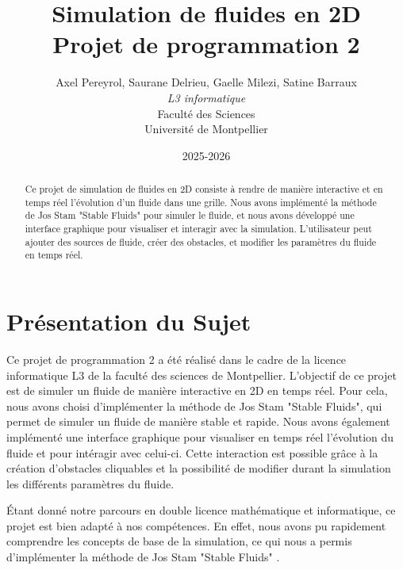 \documentclass[a4paper]{article}
\title{Simulation de fluides en 2D \\ %
Projet de programmation 2}
\author{Axel Pereyrol, Saurane Delrieu, Gaelle Milezi, Satine Barraux \\
    \emph{L3 informatique} \\
    Faculté des Sciences \\
    Université de Montpellier
}
\date{2025-2026}
\begin{document}
\maketitle     %
\begin{abstract}     %
Ce projet de simulation de fluides en 2D consiste à rendre de manière interactive et 
en temps réel l'évolution d'un fluide dans une grille. Nous avons implémenté la 
méthode de Jos Stam "Stable Fluids" pour simuler le fluide, et nous 
avons développé une interface graphique pour visualiser et interagir avec la 
simulation. L'utilisateur peut ajouter des sources de fluide, créer des obstacles, et 
modifier les paramètres du fluide en temps réel. 
\end{abstract}
\newpage
\tableofcontents
\newpage

\section{Présentation du Sujet} 

\hspace*{\parindent} Ce projet de programmation 2 a été réalisé dans le cadre de la licence informatique 
    L3  de la faculté des sciences de Montpellier. L'objectif de ce projet est de 
    simuler un fluide de manière interactive en 2D en temps réel. Pour cela, nous 
    avons choisi d'implémenter la méthode de Jos Stam "Stable Fluids", qui permet de 
    simuler un fluide de manière stable et rapide. Nous avons également implémenté une 
    interface graphique pour  visualiser en temps réel l'évolution du fluide et pour 
    intéragir avec celui-ci. Cette interaction est possible grâce à la création  
    d'obstacles cliquables et la possibilité de modifier durant la simulation les 
    différents paramètres du fluide.





    Étant donné notre parcours en double licence mathématique et 
    informatique, ce projet est bien adapté à nos compétences. En effet, nous 
    avons pu rapidement comprendre les concepts de base de la simulation, ce 
    qui nous a permis d'implémenter la méthode de Jos Stam "Stable Fluids" .
\end{document}
